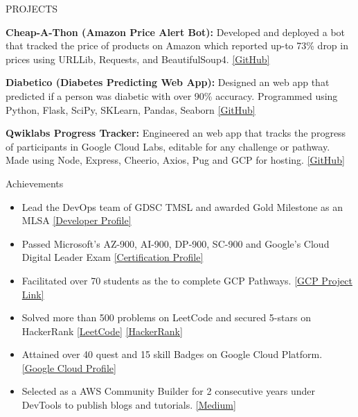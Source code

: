 \documentclass{resume} %
\begin{document}
\begin{rSection}{PROJECTS}
\vspace{-1.25em}

\item \textbf{Cheap-A-Thon (Amazon Price Alert Bot):} {Developed and deployed a bot that tracked the price of products on Amazon which reported up-to 73\% drop in prices using URLLib, Requests, and BeautifulSoup4.}
\href{https://github.com/Sabyasachi-Seal/AmazonPriceDropAlert}{[GitHub]}

\item \textbf{Diabetico (Diabetes Predicting Web App):} {Designed an web app that predicted if a person was diabetic with over 90\% accuracy. Programmed using Python, Flask, SciPy, SKLearn, Pandas, Seaborn}
\href{https://github.com/Sabyasachi-Seal/DiabetesPredictor}{[GitHub]}

\item \textbf{Qwiklabs Progress Tracker:} {Engineered an web app that tracks the progress of participants in Google Cloud Labs, editable for any challenge or pathway. Made using Node, Express, Cheerio, Axios, Pug and GCP for hosting.} \href{https://github.com/Sabyasachi-Seal/QwiklabsProgressTracker}{[GitHub]}
\end{rSection} 

\begin{rSection}{Achievements} 
\begin{itemize}
    \itemsep -1pt {} 
    \item 	Lead the DevOps team of GDSC TMSL and awarded Gold Milestone as an MLSA \href{https://gdsc.community.dev/techno-main-salt-lake-kolkata/}{[Developer Profile]}
    \item 	Passed Microsoft's AZ-900, AI-900, DP-900, SC-900 and Google's Cloud Digital Leader Exam \href{https://docs.microsoft.com/en-us/users/sabyasachiseal-9602/certifications}{[Certification Profile]}
    \item	Facilitated over 70 students as the to complete GCP Pathways.
    \href{https://cloudskillsboostprogresstracker-j44zd2vilq-uc.a.run.app/}{[GCP Project Link]}
    \item	Solved more than 500 problems on LeetCode and secured 5-stars on HackerRank
    \href{https://leetcode.com/sabyasachiseal/}{[LeetCode]}
    \href{https://www.hackerrank.com/yoboy907}{[HackerRank]}
    \item	Attained over 40 quest and 15 skill Badges on Google Cloud Platform.
    \href{https://www.cloudskillsboost.google/public_profiles/e3e3af1f-e2c8-48b5-ae19-175dee7b6ef5}{[Google Cloud Profile]}
    \item	Selected as a AWS Community Builder for 2 consecutive years under DevTools to publish blogs and tutorials.
    \href{https://www.cloudskillsboost.google/public_profiles/e3e3af1f-e2c8-48b5-ae19-175dee7b6ef5}{[Medium]}
\end{itemize}


\end{rSection}

\end{document}
